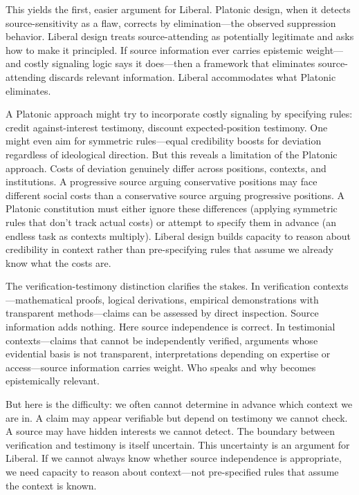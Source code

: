This yields the first, easier argument for Liberal. Platonic design,
when it detects source-sensitivity as a flaw, corrects by
elimination---the observed suppression behavior. Liberal design treats
source-attending as potentially legitimate and asks how to make it
principled. If source information ever carries epistemic weight---and
costly signaling logic says it does---then a framework that eliminates
source-attending discards relevant information. Liberal accommodates
what Platonic eliminates.

A Platonic approach might try to incorporate costly signaling by
specifying rules: credit against-interest testimony, discount
expected-position testimony. One might even aim for symmetric
rules---equal credibility boosts for deviation regardless of ideological
direction. But this reveals a limitation of the Platonic approach. Costs
of deviation genuinely differ across positions, contexts, and
institutions. A progressive source arguing conservative positions may
face different social costs than a conservative source arguing
progressive positions. A Platonic constitution must either ignore these
differences (applying symmetric rules that don't track actual costs) or
attempt to specify them in advance (an endless task as contexts
multiply). Liberal design builds capacity to reason about credibility in
context rather than pre-specifying rules that assume we already know
what the costs are.

The verification-testimony distinction clarifies the stakes. In
verification contexts---mathematical proofs, logical derivations,
empirical demonstrations with transparent methods---claims can be
assessed by direct inspection. Source information adds nothing. Here
source independence is correct. In testimonial contexts---claims that
cannot be independently verified, arguments whose evidential basis is
not transparent, interpretations depending on expertise or
access---source information carries weight. Who speaks and why becomes
epistemically relevant.

But here is the difficulty: we often cannot determine in advance which
context we are in. A claim may appear verifiable but depend on testimony
we cannot check. A source may have hidden interests we cannot detect.
The boundary between verification and testimony is itself uncertain.
This uncertainty is an argument for Liberal. If we cannot always know
whether source independence is appropriate, we need capacity to reason
about context---not pre-specified rules that assume the context is
known.

